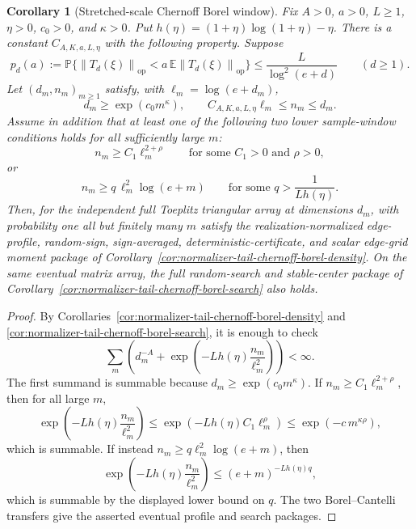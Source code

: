 \documentclass[11pt]{amsart}
\numberwithin{equation}{section}
\newtheorem{corollary}[theorem]{Corollary}
\theoremstyle{definition}
\theoremstyle{remark}
\newcommand{\op}{\mathrm{op}}
\newcommand{\Prob}{\mathbb P}
\newcommand{\Exp}{\mathbb E}
\newcommand{\norm}[1]{\left\lVert #1\right\rVert}
\begin{document}
\begin{corollary}[Stretched-scale Chernoff Borel window]
\label{cor:normalizer-tail-chernoff-borel-window}
Fix \(A>0\), \(a>0\), \(L\ge1\), \(\eta>0\), \(c_0>0\), and \(\kappa>0\).
Put \(h(\eta)=(1+\eta)\log(1+\eta)-\eta\).  There is a constant
\(C_{A,K,a,L,\eta}\) with the following property.  Suppose
\[
  p_d(a):=\Prob\{\norm{T_d(\xi)}_{\op}
      <a\,\Exp\norm{T_d(\xi)}_{\op}\}
  \le \frac{L}{\log^2(e+d)}
  \qquad(d\ge1).
\]
Let \((d_m,n_m)_{m\ge1}\) satisfy, with \(\ell_m=\log(e+d_m)\),
\[
  d_m\ge \exp(c_0m^\kappa),\qquad
  C_{A,K,a,L,\eta}\ell_m\le n_m\le d_m .
\]
Assume in addition that at least one of the following two lower sample-window
conditions holds for all sufficiently large \(m\):
\[
  n_m\ge C_1\ell_m^{2+\rho}
  \qquad\text{for some } C_1>0 \text{ and } \rho>0,
\]
or
\[
  n_m\ge q\,\ell_m^2\log(e+m)
  \qquad\text{for some } q>\frac1{Lh(\eta)} .
\]
Then, for the independent full Toeplitz triangular array at dimensions \(d_m\),
with probability one all but finitely many \(m\) satisfy the realization-normalized
edge-profile, random-sign, sign-averaged, deterministic-certificate, and scalar
edge-grid moment package of
Corollary~\ref{cor:normalizer-tail-chernoff-borel-density}.  On the same
eventual matrix array, the full random-search and stable-center package of
Corollary~\ref{cor:normalizer-tail-chernoff-borel-search} also holds.
\end{corollary}

\begin{proof}
By Corollaries~\ref{cor:normalizer-tail-chernoff-borel-density} and
\ref{cor:normalizer-tail-chernoff-borel-search}, it is enough to check
\[
  \sum_m\left(d_m^{-A}+
  \exp\left(-Lh(\eta)\frac{n_m}{\ell_m^2}\right)\right)<\infty .
\]
The first summand is summable because \(d_m\ge\exp(c_0m^\kappa)\).  If
\(n_m\ge C_1\ell_m^{2+\rho}\), then for all large \(m\),
\[
  \exp\left(-Lh(\eta)\frac{n_m}{\ell_m^2}\right)
  \le \exp(-Lh(\eta)C_1\ell_m^\rho)
  \le \exp(-c\,m^{\kappa\rho}),
\]
which is summable.  If instead
\(n_m\ge q\ell_m^2\log(e+m)\), then
\[
  \exp\left(-Lh(\eta)\frac{n_m}{\ell_m^2}\right)
  \le (e+m)^{-Lh(\eta)q},
\]
which is summable by the displayed lower bound on \(q\).  The two Borel--Cantelli
transfers give the asserted eventual profile and search packages.
\end{proof}
\end{document}

